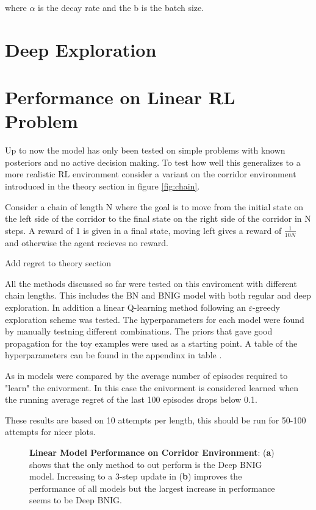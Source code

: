 where $\alpha$ is the decay rate and the b is the batch size.

\section{Deep Exploration}

\cite{osband_2018}

\section{Performance on Linear RL Problem}

Up to now the model has only been tested on simple problems with known posteriors and no active decision making. To test how well this generalizes to a more realistic RL environment consider a variant on the corridor environment introduced in the theory section in figure \ref{fig:chain}.

Consider a chain of length N where the goal is to move from the initial state on the left side of the corridor to the final state on the right side of the corridor in N steps. A reward of 1 is given in a final state, moving left gives a reward of $\frac{1}{10N}$ and otherwise the agent recieves no reward.

\todo Add regret to theory section

All the methods discussed so far were tested on this enviroment with different chain lengths. This includes the BN and BNIG model with both regular and deep exploration. In addition a linear Q-learning method following an $\varepsilon$-greedy exploration scheme was tested. The hyperparameters for each model were found by manually testning different combinations. The priors that gave good propagation for the toy examples were used as a starting point. A table of the hyperparameters can be found in the appendinx in table \todo.

As in \cite{osband_2018} models were compared by the average number of episodes required to "learn" the enivorment. In this case the enivorment is considered learned when the running average regret of the last 100 episodes drops below 0.1.

\todo These results are based on 10 attempts per length, this should be run for 50-100 attempts for nicer plots.

\begin{figure}[H]
    \centering
    \caption{\textbf{Linear Model Performance on Corridor Environment}: (\textbf{a}) shows that the only method to out perform is the Deep BNIG model. Increasing to a 3-step update in (\textbf{b}) improves the performance of all models but the largest increase in performance seems to be Deep BNIG.}
    \label{fig:linear_corridor}
\end{figure}

